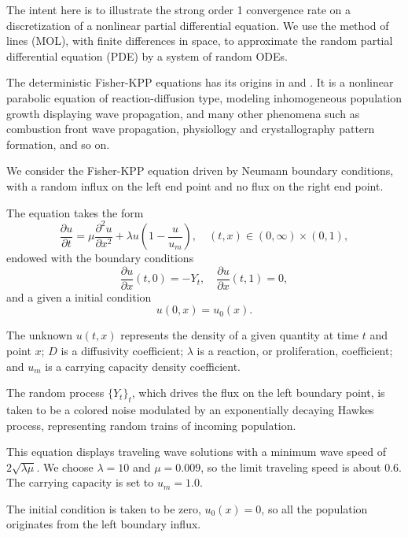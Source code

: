 \documentclass[reqno,12pt]{amsart}
\theoremstyle{plain} %
\theoremstyle{definition} %
\begin{document}
The intent here is to illustrate the strong order 1 convergence rate on a discretization of a nonlinear partial differential equation. We use the method of lines (MOL), with finite differences in space, to approximate the random partial differential equation (PDE) by a system of random ODEs.

The deterministic Fisher-KPP equations has its origins in \cite{Fisher1937} and \cite{KPP1937}. It is a nonlinear parabolic equation of reaction-diffusion type, modeling inhomogeneous population growth displaying wave propagation, and many other phenomena such as combustion front wave propagation, physiollogy and crystallography pattern formation, and so on.

We consider the Fisher-KPP equation driven by Neumann boundary conditions, with a random influx on the left end point and no flux on the right end point.

The equation takes the form
\begin{equation}
    \label{fisherkpprode}
    \frac{\partial u}{\displaystyle \partial t} = \mu\frac{\partial^2 u}{\partial x^2} + \lambda u\left(1 - \frac{u}{u_m}\right), \quad (t, x) \in (0, \infty) \times (0, 1),
\end{equation}
endowed with the boundary conditions
\begin{equation}
    \label{fisherkppbc}
    \frac{\partial u}{\partial x}(t, 0) = - Y_t, \quad \frac{\partial u}{\partial x}(t, 1) = 0,
\end{equation}
and a given a initial condition
\[
   u(0, x) = u_0(x).
\]

The unknown $u(t, x)$ represents the density of a given quantity at time $t$ and point $x$; $D$ is a diffusivity coefficient; $\lambda$ is a reaction, or proliferation, coefficient; and $u_m$ is a carrying capacity density coefficient.

The random process $\{Y_t\}_t$, which drives the flux on the left boundary point, is taken to be a colored noise modulated by an exponentially decaying Hawkes process, representing random trains of incoming population.

This equation displays traveling wave solutions with a minimum wave speed of $2 \sqrt{\lambda \mu}$. We choose $\lambda = 10$ and $\mu= 0.009$, so the limit traveling speed is about $0.6$. The carrying capacity is set to $u_m = 1.0$.

The initial condition is taken to be zero, $u_0(x) = 0$, so all the population originates from the left boundary influx.
\end{document}

